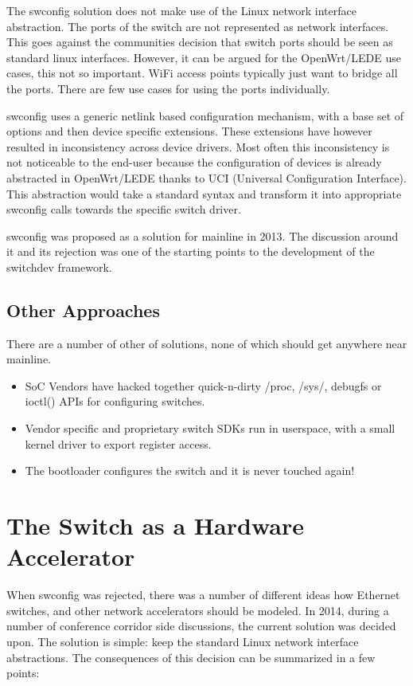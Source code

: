 \documentclass[letterpaper]{article}
\begin{document}
The swconfig solution does not make use of the Linux network interface
abstraction. The ports of the switch are not represented as network
interfaces. This goes against the communities decision that switch
ports should be seen as standard linux interfaces. However, it can be
argued for the OpenWrt/LEDE use cases, this not so important. WiFi
access points typically just want to bridge all the ports. There are
few use cases for using the ports individually.

swconfig uses a generic netlink based configuration mechanism, with a
base set of options and then device specific extensions. These
extensions have however resulted in inconsistency across device
drivers. Most often this inconsistency is not noticeable to the
end-user because the configuration of devices is already abstracted in
OpenWrt/LEDE thanks to UCI (Universal Configuration Interface). This
abstraction would take a standard syntax and transform it into
appropriate swconfig calls towards the specific switch driver.

swconfig was proposed \cite{swconfig} as a solution for mainline in
2013. The discussion around it and its rejection was one of the
starting points to the development of the switchdev framework.

\subsection{Other Approaches}

There are a number of other of solutions, none of which should get
anywhere near mainline.

\begin{itemize}
\item SoC Vendors have hacked together quick-n-dirty /proc, /sys/,
  debugfs or ioctl() APIs for configuring switches.
\item Vendor specific and proprietary switch SDKs run in userspace,
  with a small kernel driver to export register access.
\item The bootloader configures the switch and it is never touched again!
\end{itemize}

\section{The Switch as a Hardware Accelerator}

When swconfig was rejected, there was a number of different ideas how
Ethernet switches, and other network accelerators should be modeled.
In 2014, during a number of conference corridor side discussions, the
current solution was decided upon. The solution is simple: keep the
standard Linux network interface abstractions. The consequences of
this decision can be summarized in a few points:
\end{document}
